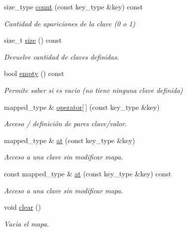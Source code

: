 \begin{DoxyCompactItemize}
size\+\_\+type \mbox{\hyperlink{classstring__map_aaca5a3ee235d2e7dd09e58385fff4f47}{count}} (const key\+\_\+type \&key) const
\begin{DoxyCompactList}\small\item\em Cantidad de apariciones de la clave (0 o 1) \end{DoxyCompactList}\item 
size\+\_\+t \mbox{\hyperlink{classstring__map_a4fabf7143525fb9e00d7cf3279f6d854}{size}} () const
\begin{DoxyCompactList}\small\item\em Devuelve cantidad de claves definidas. \end{DoxyCompactList}\item 
bool \mbox{\hyperlink{classstring__map_a55e9dbcd6209953b93c7a98d93e154b6}{empty}} () const
\begin{DoxyCompactList}\small\item\em Permite saber si es vacio (no tiene ninguna clave definida) \end{DoxyCompactList}\item 
mapped\+\_\+type \& \mbox{\hyperlink{classstring__map_a82bd8d05388e69e02a75980ef759e217}{operator\mbox{[}$\,$\mbox{]}}} (const key\+\_\+type \&key)
\begin{DoxyCompactList}\small\item\em Acceso / definición de pares clave/valor. \end{DoxyCompactList}\item 
mapped\+\_\+type \& \mbox{\hyperlink{classstring__map_afcc707f585755be24ffc4b06149f1cec}{at}} (const key\+\_\+type \&key)
\begin{DoxyCompactList}\small\item\em Acceso a una clave sin modificar mapa. \end{DoxyCompactList}\item 
const mapped\+\_\+type \& \mbox{\hyperlink{classstring__map_aa57a57621a1bd76ce603bc9b22606458}{at}} (const key\+\_\+type \&key) const
\begin{DoxyCompactList}\small\item\em Acceso a una clave sin modificar mapa. \end{DoxyCompactList}\item 
\mbox{\label{classstring__map_a5e0460b9c8c6f7c6e5f76e0112446842}} 
void \mbox{\hyperlink{classstring__map_a5e0460b9c8c6f7c6e5f76e0112446842}{clear}} ()
\begin{DoxyCompactList}\small\item\em Vacia el mapa. \end{DoxyCompactList}\item 

\end{DoxyCompactItemize}
